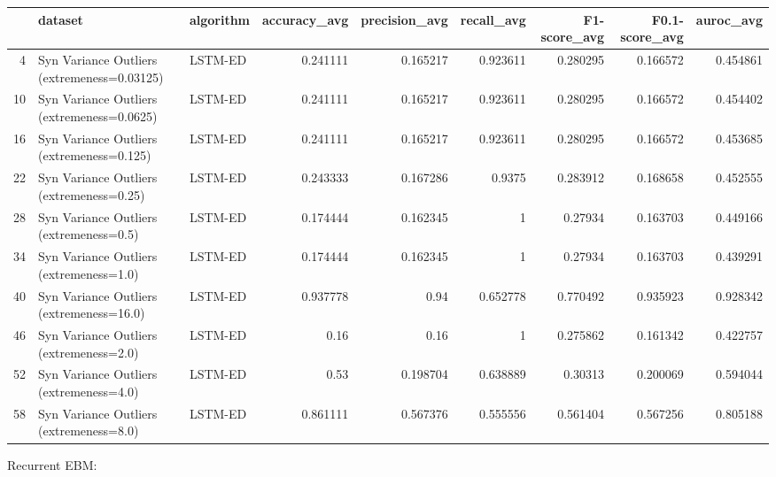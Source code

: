 \begin{tabular}{rllrrrrrr}
\hline
    & dataset                                     & algorithm   &   accuracy\_avg &   precision\_avg &   recall\_avg &   F1-score\_avg &   F0.1-score\_avg &   auroc\_avg \\
\hline
  4 & Syn Variance Outliers (extremeness=0.03125) & LSTM-ED     &       0.241111 &        0.165217 &     0.923611 &       0.280295 &         0.166572 &    0.454861 \\
 10 & Syn Variance Outliers (extremeness=0.0625)  & LSTM-ED     &       0.241111 &        0.165217 &     0.923611 &       0.280295 &         0.166572 &    0.454402 \\
 16 & Syn Variance Outliers (extremeness=0.125)   & LSTM-ED     &       0.241111 &        0.165217 &     0.923611 &       0.280295 &         0.166572 &    0.453685 \\
 22 & Syn Variance Outliers (extremeness=0.25)    & LSTM-ED     &       0.243333 &        0.167286 &     0.9375   &       0.283912 &         0.168658 &    0.452555 \\
 28 & Syn Variance Outliers (extremeness=0.5)     & LSTM-ED     &       0.174444 &        0.162345 &     1        &       0.27934  &         0.163703 &    0.449166 \\
 34 & Syn Variance Outliers (extremeness=1.0)     & LSTM-ED     &       0.174444 &        0.162345 &     1        &       0.27934  &         0.163703 &    0.439291 \\
 40 & Syn Variance Outliers (extremeness=16.0)    & LSTM-ED     &       0.937778 &        0.94     &     0.652778 &       0.770492 &         0.935923 &    0.928342 \\
 46 & Syn Variance Outliers (extremeness=2.0)     & LSTM-ED     &       0.16     &        0.16     &     1        &       0.275862 &         0.161342 &    0.422757 \\
 52 & Syn Variance Outliers (extremeness=4.0)     & LSTM-ED     &       0.53     &        0.198704 &     0.638889 &       0.30313  &         0.200069 &    0.594044 \\
 58 & Syn Variance Outliers (extremeness=8.0)     & LSTM-ED     &       0.861111 &        0.567376 &     0.555556 &       0.561404 &         0.567256 &    0.805188 \\
\hline
\end{tabular}

Recurrent EBM:

